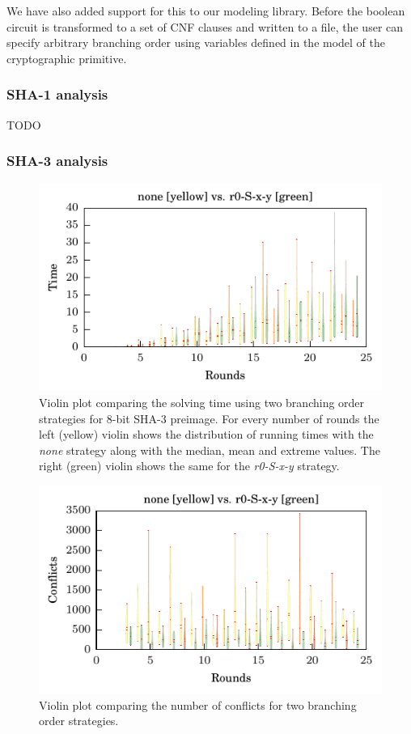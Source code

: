 We have also added support for this to our modeling library.
Before the boolean circuit is transformed to a set of CNF clauses and written to a file, the user can specify arbitrary branching order using variables defined in the model of the cryptographic primitive.

\subsubsection{SHA-1 analysis}
TODO

\subsubsection{SHA-3 analysis}
\begin{figure}
\centering \includegraphics{figures/bo-ex1/sbs-time-none-r0sxy.pdf}
\caption{Violin plot comparing the solving time using two branching order strategies for $8$-bit SHA-3 preimage. For every number of rounds the left (yellow) violin shows the distribution of running times with the \emph{none} strategy along with the median, mean and extreme values. The right (green) violin shows the same for the \emph{r0-S-x-y} strategy.}
\label{fig:bo-sbs-time-none-r0sxy}
\end{figure}

\begin{figure}
\centering \includegraphics{figures/bo-ex1/sbs-confl-none-r0sxy.pdf}
\caption{Violin plot comparing the number of conflicts for two branching order strategies.}
\label{fig:bo-sbs-confl-none-r0sxy}
\end{figure}


